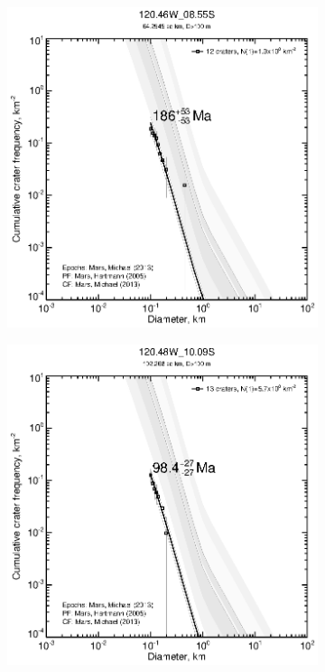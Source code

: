 \documentclass[12pt,letter]{article}
\begin{document}
\begin{figure}[h]
\centering
\begin{subfigure}{.33\textwidth}
  \includegraphics[width=\linewidth,clip,trim=1cm 1cm 1.5cm 1cm]{figures/craterstats/120-46W_08-55S_100m_cum.eps}
\end{subfigure}%
\begin{subfigure}{.33\textwidth}
  \includegraphics[width=\linewidth,clip,trim=1cm 1cm 1.5cm 1cm]{figures/craterstats/120-48W_10-09S_100m_cum.eps}

\end{subfigure}
\end{figure}
\end{document}
